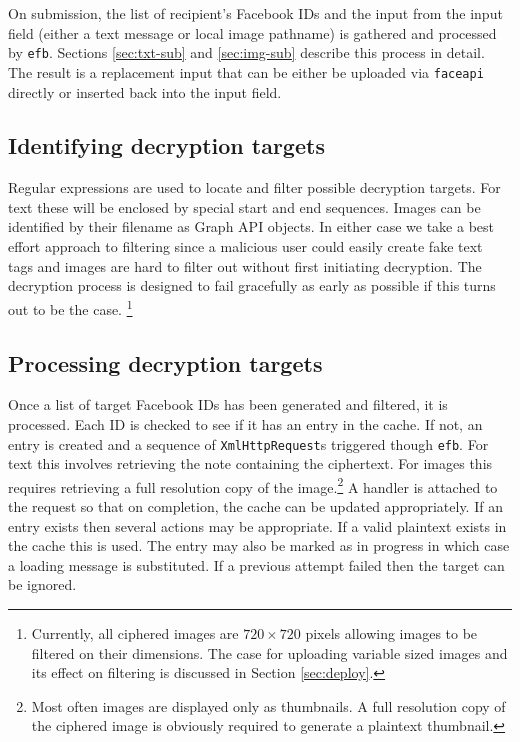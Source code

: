 On submission, the list of recipient's Facebook IDs and the input from the input field (either a text message or local image pathname) is gathered and processed by {\tt efb}. Sections \ref{sec:txt-sub} and \ref{sec:img-sub} describe this process in detail. The result is a replacement input that can be either be uploaded via {\tt faceapi} directly or inserted back into the input field.

\subsection{Identifying decryption targets}
\label{ssec:ident-targets}

Regular expressions are used to locate and filter possible decryption targets. For text these will be enclosed by special start and end sequences. Images can be identified by their filename as Graph API objects. In either case we take a best effort approach to filtering since a malicious user could easily create fake text tags and images are hard to filter out without first initiating decryption. The decryption process is designed to fail gracefully as early as possible if this turns out to be the case. \footnote{Currently, all ciphered images are $720 \times 720$ pixels allowing images to be filtered on their dimensions. The case for uploading variable sized images and its effect on filtering is discussed in Section \ref{sec:deploy}.}

    
\subsection{Processing decryption targets}

Once a list of target Facebook IDs has been generated and filtered, it is processed. Each ID is checked to see if it has an entry in the cache. If not, an entry is created and a sequence of {\tt XmlHttpRequest}s triggered though {\tt efb}. For text this involves retrieving the note containing the ciphertext. For images this requires retrieving a full resolution copy of the image.\footnote{Most often images are displayed only as thumbnails. A full resolution copy of the ciphered image is obviously required to generate a plaintext thumbnail.} A handler is attached to the request so that on completion, the cache can be updated appropriately. If an entry exists then several actions may be appropriate. If a valid plaintext exists in the cache this is used. The entry may also be marked as in progress in which case a loading message is substituted. If a previous attempt failed then the target can be ignored.

